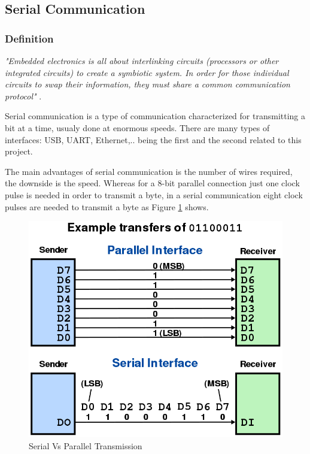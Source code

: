 \subsection{Serial Communication}\label{ssec:serialCommunication}

\subsubsection{Definition}\label{sssec:serialCommunicationDefinition}
	\textit{"Embedded electronics is all about interlinking circuits (processors or other integrated circuits) to create a symbiotic system. In order for those individual circuits to swap their information, they must share a common communication protocol"} \cite{sparkfunSerial}.
\par
	Serial communication is a type of communication characterized for transmitting a bit at a time, usualy done at enormous speeds. There are many types of interfaces: USB, UART, Ethernet,.. being the first and the second related to this project.
\par
	The main advantages of serial communication is the number of wires required, the downside is the speed. Whereas for a 8-bit parallel connection just one clock pulse is needed in order to transmit a byte, in a serial communication eight clock pulses are needed to transmit a byte as Figure \ref{fig:serial_vs_parallel_transmission} shows. 

		\begin{figure}[htbp]
			\centering
				\includegraphics[scale=0.45]{figuras/fig-serial_vs_parallel_transmission}
			\caption{Serial Vs Parallel Transmission \cite{serial_vs_parallel_transmission}}
			\label{fig:serial_vs_parallel_transmission}
		\end{figure}

